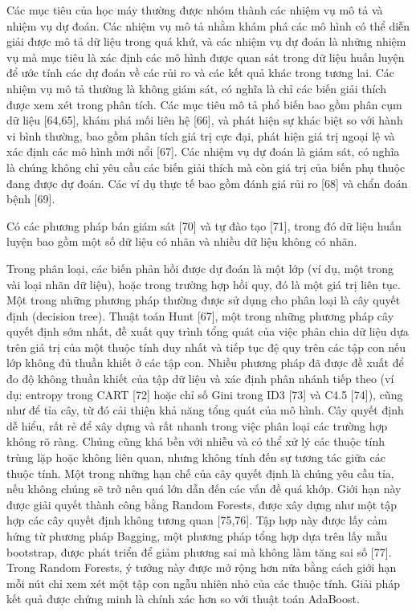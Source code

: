 \documentclass[utf8]{frontiersSCNS} %
\begin{document}
Các mục tiêu của học máy thường được nhóm thành các nhiệm vụ mô tả và nhiệm vụ dự đoán. Các nhiệm vụ mô tả nhằm khám phá các mô hình có thể diễn giải được mô tả dữ liệu trong quá khứ, và các nhiệm vụ dự đoán là những nhiệm vụ mà mục tiêu là xác định các mô hình được quan sát trong dữ liệu huấn luyện để ước tính các dự đoán về các rủi ro và các kết quả khác trong tương lai. Các nhiệm vụ mô tả thường là không giám sát, có nghĩa là chỉ các biến giải thích được xem xét trong phân tích. Các mục tiêu mô tả phổ biến bao gồm phân cụm dữ liệu [64,65], khám phá mối liên hệ [66], và phát hiện sự khác biệt so với hành vi bình thường, bao gồm phân tích giá trị cực đại, phát hiện giá trị ngoại lệ và xác định các mô hình mới nổi [67]. Các nhiệm vụ dự đoán là giám sát, có nghĩa là chúng không chỉ yêu cầu các biến giải thích mà còn giá trị của biến phụ thuộc đang được dự đoán. Các ví dụ thực tế bao gồm đánh giá rủi ro [68] và chẩn đoán bệnh [69].

Có các phương pháp bán giám sát [70] và tự đào tạo [71], trong đó dữ liệu huấn luyện bao gồm một số dữ liệu có nhãn và nhiều dữ liệu không có nhãn.

Trong phân loại, các biến phản hồi được dự đoán là một lớp (ví dụ, một trong vài loại nhãn dữ liệu), hoặc trong trường hợp hồi quy, đó là một giá trị liên tục. Một trong những phương pháp thường được sử dụng cho phân loại là cây quyết định (decision tree). Thuật toán Hunt [67], một trong những phương pháp cây quyết định sớm nhất, đề xuất quy trình tổng quát của việc phân chia dữ liệu dựa trên giá trị của một thuộc tính duy nhất và tiếp tục đệ quy trên các tập con nếu lớp không đủ thuần khiết ở các tập con. Nhiều phương pháp đã được đề xuất để đo độ không thuần khiết của tập dữ liệu và xác định phân nhánh tiếp theo (ví dụ: entropy trong CART [72] hoặc chỉ số Gini trong ID3 [73] và C4.5 [74]), cũng như để tỉa cây, từ đó cải thiện khả năng tổng quát của mô hình. Cây quyết định dễ hiểu, rất rẻ để xây dựng và rất nhanh trong việc phân loại các trường hợp không rõ ràng. Chúng cũng khá bền với nhiễu và có thể xử lý các thuộc tính trùng lặp hoặc không liên quan, nhưng không tính đến sự tương tác giữa các thuộc tính. Một trong những hạn chế của cây quyết định là chúng yêu cầu tỉa, nếu không chúng sẽ trở nên quá lớn dẫn đến các vấn đề quá khớp. Giới hạn này được giải quyết thành công bằng Random Forests, được xây dựng như một tập hợp các cây quyết định không tương quan [75,76]. Tập hợp này được lấy cảm hứng từ phương pháp Bagging, một phương pháp tổng hợp dựa trên lấy mẫu bootstrap, được phát triển để giảm phương sai mà không làm tăng sai số [77]. Trong Random Forests, ý tưởng này được mở rộng hơn nữa bằng cách giới hạn mỗi nút chỉ xem xét một tập con ngẫu nhiên nhỏ của các thuộc tính. Giải pháp kết quả được chứng minh là chính xác hơn so với thuật toán AdaBoost.
\end{document}
